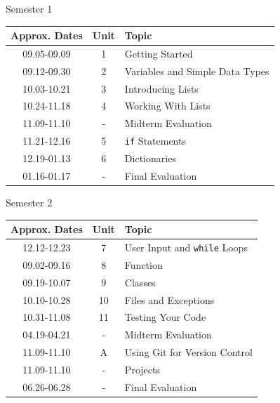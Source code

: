\documentclass[aspectratio=169]{beamer}
\begin{document}
\begin{frame}{Semester 1}
    \begin{table}
    \centering
        \begin{tabular}{ccl}
            \toprule
            \textbf{Approx. Dates} & \textbf{Unit} & \textbf{Topic}                  \\
            \midrule
            09.05-09.09            & 1             & Getting Started                 \\
            09.12-09.30            & 2             & Variables and Simple Data Types \\
            10.03-10.21            & 3             & Introducing Lists               \\
            10.24-11.18            & 4             & Working With Lists              \\
            11.09-11.10            & -             & Midterm Evaluation              \\
            11.21-12.16            & 5             & \texttt{if} Statements          \\
            12.19-01.13            & 6             & Dictionaries                    \\
            01.16-01.17            & -             & Final Evaluation                \\
            \bottomrule
        \end{tabular}
    \end{table}   
\end{frame}


\begin{frame}{Semester 2}
    \begin{table}
    \centering
        \begin{tabular}{ccl}
            \toprule
            \textbf{Approx. Dates} & \textbf{Unit} & \textbf{Topic}                                 \\
            \midrule
            12.12-12.23            & 7             & User Input and \texttt{while} Loops \\
            09.02-09.16            & 8             & Function \\
            09.19-10.07            & 9             & Classes \\
            10.10-10.28            & 10            & Files and Exceptions \\
            10.31-11.08            & 11            & Testing Your Code \\
            04.19-04.21            & -             & Midterm Evaluation                             \\
            11.09-11.10            & A             & Using Git for Version Control \\
            11.09-11.10            & -             & Projects \\
            06.26-06.28            & -             & Final Evaluation \\
            \bottomrule
        \end{tabular}
    \end{table}   
\end{frame}
\end{document}
